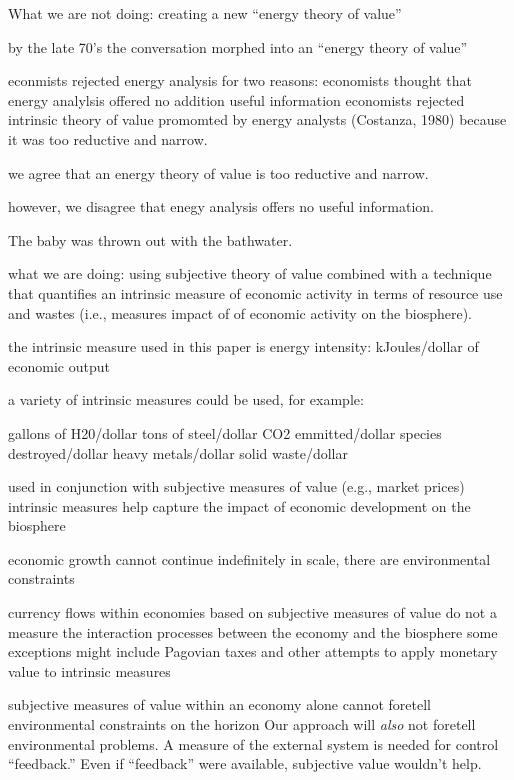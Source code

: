 \begin{outline}[enumerate]

\1 What we are not doing: creating a new ``energy theory of value''

	\2 by the late 70's the conversation morphed into an ``energy theory of value''

	\2 econmists rejected energy analysis for two reasons: 
		\3 economists thought that energy analylsis offered no addition useful information
		\3 economists rejected intrinsic theory of value
		promomted by energy analysts (Costanza, 1980) because it was too reductive and narrow.
		
	\2 we agree that an energy theory of value is too reductive and narrow.
	
	\2 however, we disagree that enegy analysis offers no useful information.
	
	\2 The baby was thrown out with the bathwater.

\1 what we are doing: using subjective 
theory of value combined with a technique 
that quantifies an intrinsic measure of economic activity in terms of resource
use and wastes (i.e., measures impact of of economic activity on the biosphere).

	\2 the intrinsic measure used in this paper is energy intensity: kJoules/dollar of economic output

	\2 a variety of intrinsic measures could be used, for example:

		\3 gallons of H20/dollar
		\3 tons of steel/dollar
		\3 CO2 emmitted/dollar
		\3 species destroyed/dollar
		\3 heavy metals/dollar
		\3 solid waste/dollar

	\2 used in conjunction with subjective measures of value (e.g., market prices) intrinsic measures help capture the impact of economic development on the biosphere

	\2 economic growth cannot continue indefinitely in scale, there are environmental constraints

	\2 currency flows within economies based on subjective measures of value do not a measure the interaction processes between the economy and the biosphere
		\3 some exceptions might include Pagovian taxes and other attempts to apply monetary value to intrinsic measures

	\2 subjective measures of value within an economy alone cannot foretell environmental constraints on the horizon
		\3 Our approach will \emph{also} not foretell environmental problems.
		\3 A measure of the external system is needed for control ``feedback.''
		\3 Even if ``feedback'' were available, subjective value wouldn't help.


\end{outline}
